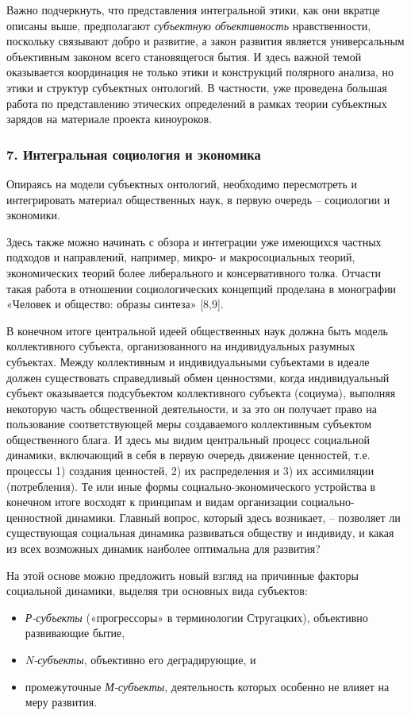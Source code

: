     Важно подчеркнуть, что представления интегральной этики, как они вкратце описаны выше, предполагают \textit{субъектную объективность} нравственности, поскольку связывают добро и развитие, а закон развития является универсальным объективным законом всего становящегося бытия. И здесь важной темой оказывается координация не только этики и конструкций полярного анализа, но этики и структур субъектных онтологий. В частности, уже проведена большая работа по представлению этических определений в рамках теории субъектных зарядов на материале проекта киноуроков.

    \subsubsection*{7. Интегральная социология и экономика}
    Опираясь на модели субъектных онтологий, необходимо пересмотреть и интегрировать материал общественных наук, в первую очередь – социологии и экономики.

    Здесь также можно начинать с обзора и интеграции уже имеющихся частных подходов и направлений, например, микро- и макросоциальных теорий, экономических теорий более либерального и консервативного толка. Отчасти такая работа в отношении социологических концепций проделана в монографии «Человек и общество: образы синтеза» [8,9].

    В конечном итоге центральной идеей общественных наук должна быть модель коллективного субъекта, организованного на индивидуальных разумных субъектах. Между коллективным и индивидуальными субъектами в идеале должен существовать справедливый обмен ценностями, когда индивидуальный субъект оказывается подсубъектом коллективного субъекта (социума), выполняя некоторую часть общественной деятельности, и за это он получает право на пользование соответствующей меры создаваемого коллективным субъектом общественного блага. И здесь мы видим центральный процесс социальной динамики, включающий в себя в первую очередь движение ценностей, т.е. процессы 1) создания ценностей, 2) их распределения и 3) их ассимиляции (потребления). Те или иные формы социально-экономического устройства в конечном итоге восходят к принципам и видам организации социально-ценностной динамики. Главный вопрос, который здесь возникает, – позволяет ли существующая социальная динамика развиваться обществу и индивиду, и какая из всех возможных динамик наиболее оптимальна для развития?

    На этой основе можно предложить новый взгляд на причинные факторы социальной динамики, выделяя три основных вида субъектов: 
    \begin{itemize}
        \item \textit{Р-субъекты} («прогрессоры» в терминологии Стругацких), объективно развивающие бытие, 
        \item \textit{N-субъекты}, объективно его деградирующие, и
        \item промежуточные \textit{М-субъекты}, деятельность которых особенно не влияет на меру развития.
    \end{itemize}

